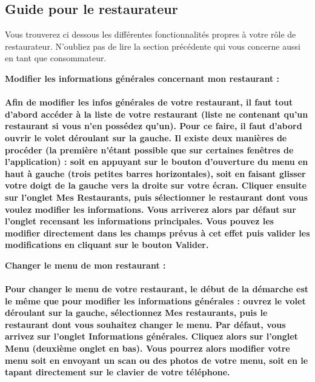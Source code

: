 \subsection{Guide pour le restaurateur}

Vous trouverez ci dessous les différentes fonctionnalités propres à votre rôle de restaurateur. N'oubliez pas de lire la section précédente qui vous concerne aussi en tant que consommateur. \\

\begin{description}
    \item \bf{Modifier les informations générales concernant mon restaurant :} \\ \\
    Afin de modifier les infos générales de votre restaurant, il faut tout d'abord accéder à la liste de votre restaurant (liste ne contenant qu'un restaurant si vous n'en possédez qu'un). Pour ce faire, il faut d'abord ouvrir le volet déroulant sur la gauche. Il existe deux manières de procéder (la première n'étant possible que sur certaines fenêtres de l’application) : soit en appuyant sur le bouton d'ouverture du menu en haut à gauche (trois petites barres horizontales), soit en faisant glisser votre doigt de la gauche vers la droite sur votre écran. Cliquer ensuite sur l’onglet \og{}Mes Restaurants\fg{}, puis sélectionner le restaurant dont vous voulez modifier les informations. Vous arriverez alors par défaut sur l'onglet recensant les informations principales. Vous pouvez les modifier directement dans les champs prévus à cet effet puis valider les modifications en cliquant sur le bouton \og{}Valider\fg{}. \\

    \item \bf{Changer le menu de mon restaurant :} \\ \\
    Pour changer le menu de votre restaurant, le début de la démarche est le même que pour modifier les informations générales : ouvrez le volet déroulant sur la gauche, sélectionnez \og{}Mes restaurants\fg{}, puis le restaurant dont vous souhaitez changer le menu. Par défaut, vous arrivez sur l'onglet \og{}Informations générales\fg{}. Cliquez alors sur l'onglet \og{}Menu\fg{} (deuxième onglet en bas). Vous pourrez alors modifier votre menu soit en envoyant un scan ou des photos de votre menu, soit en le tapant directement sur le clavier de votre téléphone. \\
        

\end{description}
